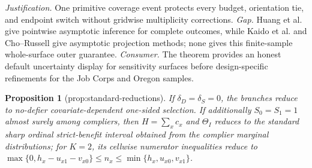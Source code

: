 \documentclass{article}
\newtheorem{proposition}{Proposition}
\begin{document}
\par\smallskip\noindent \textit{Justification.} One primitive coverage event protects every budget, orientation tie, and endpoint switch without gridwise multiplicity corrections. \textit{Gap.} Huang et al. give pointwise asymptotic inference for complete outcomes, while Kaido et al. and Cho--Russell give asymptotic projection methods; none gives this finite-sample whole-surface outer guarantee. \textit{Consumer.} The theorem provides an honest default uncertainty display for sensitivity surfaces before design-specific refinements for the Job Corps and Oregon samples.

\begin{proposition}[prop:standard-reductions]\label{prop:standard-reductions}
If \(\delta_D=\delta_S=0\), the branches reduce to no-defier covariate-dependent one-sided selection. If additionally \(S_0=S_1=1\) almost surely among compliers, then \(H=\sum_xc_x\) and \(\Theta_I\) reduces to the standard sharp ordinal strict-benefit interval obtained from the complier marginal distributions; for \(K=2\), its cellwise numerator inequalities reduce to \(\max\{0,h_x-u_{x1}-v_{x0}\}\le n_x\le\min\{h_x,u_{x0},v_{x1}\}\).
\end{proposition}
\end{document}
